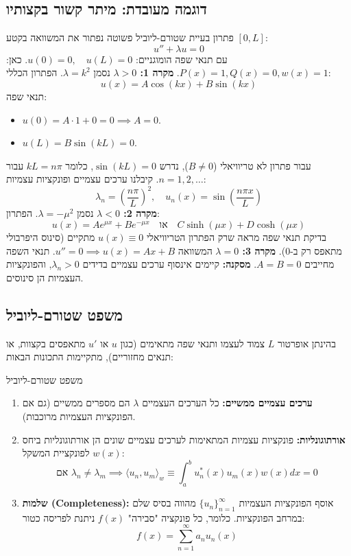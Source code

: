 \subsection*{דוגמה מעובדת: מיתר קשור בקצותיו}
\begin{examplebox}
    {פתרון בעיית שטורם-ליוביל פשוטה} נפתור את המשוואה בקטע $[0, L]$:
    \[
        u'' + \lambda u = 0
    \]
    עם תנאי שפה הומוגניים: $u(0) = 0, \quad u(L) = 0$.
    כאן: $P(x)=1, Q(x)=0, w(x)=1$.
    \textbf{מקרה 1: $\lambda > 0$} נסמן $\lambda = k^{2}$. הפתרון הכללי:
    \[
        u(x) = A \cos(kx) + B \sin(kx)
    \]
    תנאי שפה:
    \begin{itemize}
        \item $u(0) = A \cdot 1 + 0 = 0 \implies A=0$.
        \item $u(L) = B \sin(kL) = 0$.
    \end{itemize}
    עבור פתרון לא טריוויאלי ($B \neq 0$), נדרש $\sin(kL) = 0$, כלומר $kL = n\pi$ עבור $n=1,2,\dots$.
    קיבלנו ערכים עצמיים ופונקציות עצמיות:
    \[
        \lambda_{n} = \left(\frac{n\pi}{L}\right)^{2}, \quad u_{n}(x) = \sin\left(\frac{n\pi x}{L}\right)
    \]
    \textbf{מקרה 2: $\lambda < 0$} נסמן $\lambda = -\mu^{2}$. הפתרון:
    \[
        u(x) = A e^{\mu x} + B e^{-\mu x}\quad \text{או}\quad C \sinh(\mu x) + D \cosh(\mu x)
    \]
    בדיקת תנאי שפה מראה שרק הפתרון הטריוויאלי $u(x) \equiv 0$ מתקיים (סינוס היפרבולי מתאפס רק ב-0).
    \textbf{מקרה 3: $\lambda = 0$} המשוואה $u''=0 \implies u(x) = Ax+B$.
    תנאי השפה מחייבים $A=B=0$.
    \textbf{מסקנה:} קיימים אינסוף ערכים עצמיים בדידים $\lambda_{n} > 0$, והפונקציות העצמיות הן סינוסים.
\end{examplebox}

\subsection*{משפט שטורם-ליוביל}
בהינתן אופרטור $L$ צמוד לעצמו ותנאי שפה מתאימים (כגון $u$ או $u'$ מתאפסים בקצוות, או תנאים מחזוריים), מתקיימות התכונות הבאות:  
\begin{theorembox}{משפט שטורם-ליוביל}
    \begin{enumerate}
        \item \textbf{ערכים עצמיים ממשיים:} כל הערכים העצמיים $\lambda$ הם מספרים ממשיים (גם אם הפונקציות העצמיות מרוכבות).
        \item \textbf{אורתוגונליות:} פונקציות עצמיות המתאימות לערכים עצמיים שונים הן אורתוגונליות ביחס לפונקציית המשקל $w(x)$:
        \[
            \text{אם }\lambda_{n} \neq \lambda_{m} \implies \langle u_{n}, u_{m} \rangle_{w} \equiv \int_{a}^{b} u_{n}^{*}(x) u_{m}(x) w(x)  dx = 0
        \]
        \item \textbf{שלמות (Completeness):} אוסף הפונקציות העצמיות $\{u_{n}\}_{n=1}^{\infty}$ מהווה בסיס שלם במרחב הפונקציות. כלומר, כל פונקציה "סבירה" $f(x)$ ניתנת לפריסה כטור:
        \[
            f(x) = \sum_{n=1}^{\infty} a_{n} u_{n}(x)
        \]
    \end{enumerate}
\end{theorembox}

